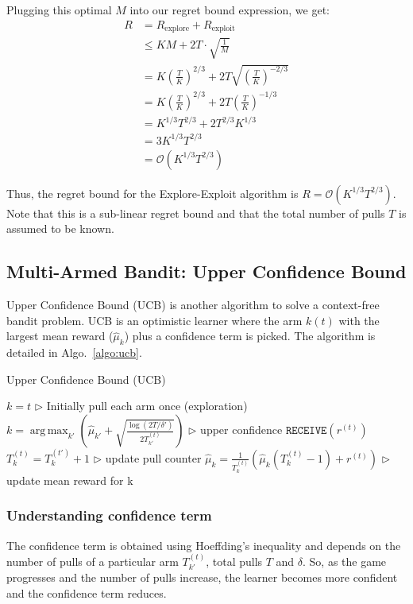 \documentclass[11pt]{article}
\DeclareMathOperator*{\argmax}{arg\,max}
\begin{document}
Plugging this optimal $M$ into our regret bound expression, we get:
\begin{align*}
    R &= R_{\text{explore}} + R_{\text{exploit}}\\
    &\leq KM + 2T \cdot \sqrt{\frac{1}{M}}\\ 
    &= K \left( \frac{T}{K} \right)^{2/3} + 2T \sqrt{\left( \frac{T}{K}\right)^{-2/3}}\\
    &= K \left( \frac{T}{K} \right)^{2/3} + 2T \left( \frac{T}{K}\right)^{-1/3}\\
    &= K^{1/3}T^{2/3} + 2T^{2/3}K^{1/3}\\
    &= 3K^{1/3}T^{2/3}\\
    &= \mathcal{O}(K^{1/3}T^{2/3})
\end{align*}

Thus, the regret bound for the Explore-Exploit algorithm is $R = \mathcal{O}(K^{1/3}T^{2/3})$. Note that this
is a sub-linear regret bound and that the total number of pulls $T$ is assumed to be known.

\subsection{Multi-Armed Bandit: Upper Confidence Bound}

Upper Confidence Bound (UCB) is another algorithm to solve a context-free bandit problem. UCB is an optimistic learner where the arm $k(t)$ with the largest mean reward ($\hat{\mu}_{k}$) plus a confidence term is picked. The algorithm is detailed in Algo.~\ref{algo:ucb}.

\begin{algorithm}[H]
\caption{Upper Confidence Bound (UCB)}
\label{algo:ucb}
\begin{algorithmic}[1]
\STATE $k = t$ \hfill $\triangleright$ Initially pull each arm once (exploration)
\ELSE
\STATE $k = \argmax_{k'} \left(\hat{\mu}_{k'
} + \sqrt{\frac{\log(2T/\delta')}{2T_{k'}^{(t)}}} \right)$ \hfill $\triangleright$ upper confidence
\ENDIF
\STATE $\mathtt{RECEIVE}(r^{(t)})$
\STATE $T_k^{(t)} = T_k^{(t')} + 1$  \hfill $\triangleright$ update pull counter
\STATE $\hat{\mu}_{k} = \frac{1}{T_k^{(t)}}\left(\hat{\mu}_{k}(T_k^{(t)} - 1) + r^{(t)}\right)$ \hfill $\triangleright$ update mean reward for k
\ENDFOR
\end{algorithmic}
\end{algorithm}

\subsubsection{Understanding confidence term}
The confidence term is obtained using Hoeffding's inequality and depends on the number of pulls of a particular arm $T_{k'}^{(t)}$, total pulls $T$ and $\delta$. So, as the game progresses and the number of pulls increase, the learner becomes more confident and the confidence term reduces.
\end{document}
